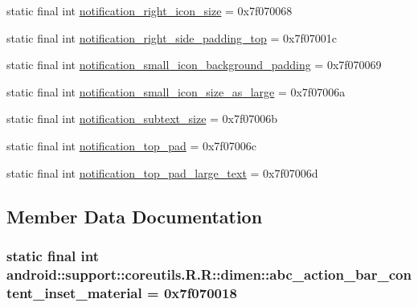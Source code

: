 \begin{CompactItemize}
\item 
static final int \hyperlink{classandroid_1_1support_1_1coreutils_1_1_r_1_1dimen_bb42dab2ed8c04d75878ef757471c586}{notification\_\-right\_\-icon\_\-size} = 0x7f070068
\item 
static final int \hyperlink{classandroid_1_1support_1_1coreutils_1_1_r_1_1dimen_f344292794f9a7f7726a0fc8146b2f0c}{notification\_\-right\_\-side\_\-padding\_\-top} = 0x7f07001c
\item 
static final int \hyperlink{classandroid_1_1support_1_1coreutils_1_1_r_1_1dimen_4d9178031c8660434a0af8e0c01f2bb0}{notification\_\-small\_\-icon\_\-background\_\-padding} = 0x7f070069
\item 
static final int \hyperlink{classandroid_1_1support_1_1coreutils_1_1_r_1_1dimen_804626a504a8849b248be2e2d7654e76}{notification\_\-small\_\-icon\_\-size\_\-as\_\-large} = 0x7f07006a
\item 
static final int \hyperlink{classandroid_1_1support_1_1coreutils_1_1_r_1_1dimen_f1885142955ddf00fbaaff6b58590ce9}{notification\_\-subtext\_\-size} = 0x7f07006b
\item 
static final int \hyperlink{classandroid_1_1support_1_1coreutils_1_1_r_1_1dimen_002798e025fe540362e51652d1f89154}{notification\_\-top\_\-pad} = 0x7f07006c
\item 
static final int \hyperlink{classandroid_1_1support_1_1coreutils_1_1_r_1_1dimen_87a5854de7842b9186604d814476a54b}{notification\_\-top\_\-pad\_\-large\_\-text} = 0x7f07006d
\end{CompactItemize}


\subsection{Member Data Documentation}
\hypertarget{classandroid_1_1support_1_1coreutils_1_1_r_1_1dimen_dc6f9dae376e43bcc0ab6e111350042e}{
\subsubsection[{abc\_\-action\_\-bar\_\-content\_\-inset\_\-material}]{\setlength{\rightskip}{0pt plus 5cm}static final int android::support::coreutils.R.R::dimen::abc\_\-action\_\-bar\_\-content\_\-inset\_\-material = 0x7f070018}}
\label{classandroid_1_1support_1_1coreutils_1_1_r_1_1dimen_dc6f9dae376e43bcc0ab6e111350042e}


